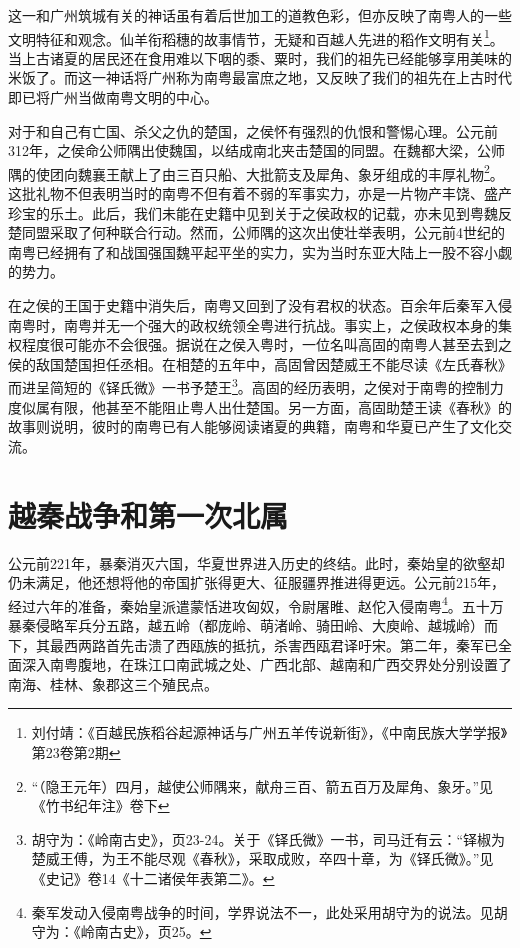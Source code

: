 这一和广州筑城有关的神话虽有着后世加工的道教色彩，但亦反映了南粤人的一些文明特征和观念。仙羊衔稻穗的故事情节，无疑和百越人先进的稻作文明有关\footnote{刘付靖：《百越民族稻谷起源神话与广州五羊传说新街》，《中南民族大学学报》第23卷第2期}。当上古诸夏的居民还在食用难以下咽的黍、粟时，我们的祖先已经能够享用美味的米饭了。而这一神话将广州称为南粤最富庶之地，又反映了我们的祖先在上古时代即已将广州当做南粤文明的中心。

对于和自己有亡国、杀父之仇的楚国，之侯怀有强烈的仇恨和警惕心理。公元前312年，之侯命公师隅出使魏国，以结成南北夹击楚国的同盟。在魏都大梁，公师隅的使团向魏襄王献上了由三百只船、大批箭支及犀角、象牙组成的丰厚礼物\footnote{“（隐王元年）四月，越使公师隅来，献舟三百、箭五百万及犀角、象牙。”见《竹书纪年注》卷下}。这批礼物不但表明当时的南粤不但有着不弱的军事实力，亦是一片物产丰饶、盛产珍宝的乐土。此后，我们未能在史籍中见到关于之侯政权的记载，亦未见到粤魏反楚同盟采取了何种联合行动。然而，公师隅的这次出使壮举表明，公元前4世纪的南粤已经拥有了和战国强国魏平起平坐的实力，实为当时东亚大陆上一股不容小觑的势力。

在之侯的王国于史籍中消失后，南粤又回到了没有君权的状态。百余年后秦军入侵南粤时，南粤并无一个强大的政权统领全粤进行抗战。事实上，之侯政权本身的集权程度很可能亦不会很强。据说在之侯入粤时，一位名叫高固的南粤人甚至去到之侯的敌国楚国担任丞相。在相楚的五年中，高固曾因楚威王不能尽读《左氏春秋》而进呈简短的《铎氏微》一书予楚王\footnote{胡守为：《岭南古史》，页23-24。关于《铎氏微》一书，司马迁有云：“铎椒为楚威王傅，为王不能尽观《春秋》，采取成败，卒四十章，为《铎氏微》。”见《史记》卷14《十二诸侯年表第二》。}。高固的经历表明，之侯对于南粤的控制力度似属有限，他甚至不能阻止粤人出仕楚国。另一方面，高固助楚王读《春秋》的故事则说明，彼时的南粤已有人能够阅读诸夏的典籍，南粤和华夏已产生了文化交流。

\section{越秦战争和第一次北属}


\indent 公元前221年，暴秦消灭六国，华夏世界进入历史的终结。此时，秦始皇的欲壑却仍未满足，他还想将他的帝国扩张得更大、征服疆界推进得更远。公元前215年，经过六年的准备，秦始皇派遣蒙恬进攻匈奴，令尉屠睢、赵佗入侵南粤\footnote{秦军发动入侵南粤战争的时间，学界说法不一，此处采用胡守为的说法。见胡守为：《岭南古史》，页25。}。五十万暴秦侵略军兵分五路，越五岭（都庞岭、萌渚岭、骑田岭、大庾岭、越城岭）而下，其最西两路首先击溃了西瓯族的抵抗，杀害西瓯君译吁宋。第二年，秦军已全面深入南粤腹地，在珠江口南武城之处、广西北部、越南和广西交界处分别设置了南海、桂林、象郡这三个殖民点。

